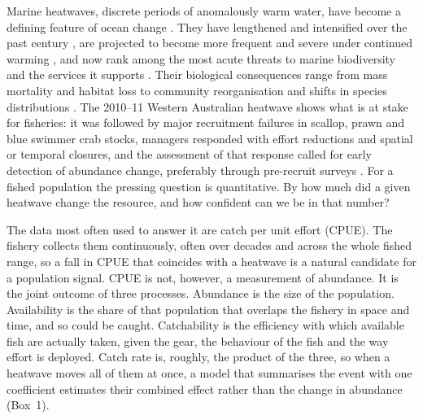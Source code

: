 \documentclass[11pt,a4paper]{article}
\begin{document}
Marine heatwaves, discrete periods of anomalously warm water, have become a defining feature of ocean change \citep{hobday2016}. They have lengthened and intensified over the past century \citep{oliver2018}, are projected to become more frequent and severe under continued warming \citep{frolicher2018,afrifa2026}, and now rank among the most acute threats to marine biodiversity and the services it supports \citep{smale2019}. Their biological consequences range from mass mortality and habitat loss to community reorganisation and shifts in species distributions \citep{wernberg2013,wernberg2016,babcock2019,cheung2020}. The 2010--11 Western Australian heatwave shows what is at stake for fisheries: it was followed by major recruitment failures in scallop, prawn and blue swimmer crab stocks, managers responded with effort reductions and spatial or temporal closures, and the assessment of that response called for early detection of abundance change, preferably through pre-recruit surveys \citep{pearce2013,caputi2016}. For a fished population the pressing question is quantitative. By how much did a given heatwave change the resource, and how confident can we be in that number?

The data most often used to answer it are catch per unit effort (CPUE). The fishery collects them continuously, often over decades and across the whole fished range, so a fall in CPUE that coincides with a heatwave is a natural candidate for a population signal. CPUE is not, however, a measurement of abundance. It is the joint outcome of three processes. Abundance is the size of the population. Availability is the share of that population that overlaps the fishery in space and time, and so could be caught. Catchability is the efficiency with which available fish are actually taken, given the gear, the behaviour of the fish and the way effort is deployed. Catch rate is, roughly, the product of the three, so when a heatwave moves all of them at once, a model that summarises the event with one coefficient estimates their combined effect rather than the change in abundance (Box~1).
\end{document}
